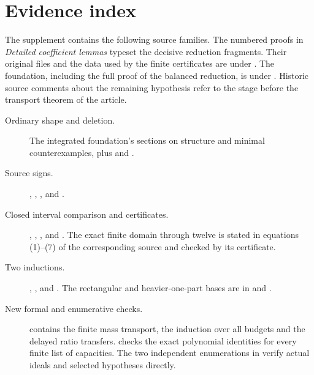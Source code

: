 \documentclass[11pt]{article}
\begin{document}
\section{Evidence index}\label{index}
The supplement contains the following source families. The numbered
proofs in \emph{Detailed coefficient lemmas} typeset the decisive
reduction fragments. Their original files and the data used by the finite
certificates are under . The foundation, including the
full proof of the balanced reduction, is under .
Historic source comments about the remaining hypothesis refer to the
stage before the transport theorem of the article.
\begingroup\small\raggedright\def\UrlBreaks{\do\_\do\.\do\/}\begin{description}
\item[Ordinary shape and deletion.] The integrated foundation's
sections on structure and minimal counterexamples, plus
 and .
\item[Source signs.] ,
,
, and
.
\item[Closed interval comparison and certificates.]
,
,
, and
.
The exact finite domain through twelve is stated in equations
(1)--(7) of the corresponding source and checked by its certificate.
\item[Two inductions.] ,
, 
and . The rectangular and heavier-one-part
bases are in  and
.
\item[New formal and enumerative checks.] 
contains the finite mass transport, the induction over all budgets and
the delayed ratio transfers.  checks
the exact polynomial identities for every finite list of capacities. The two independent enumerations in
 verify actual ideals and selected hypotheses directly.
\end{description}\endgroup
\end{document}
